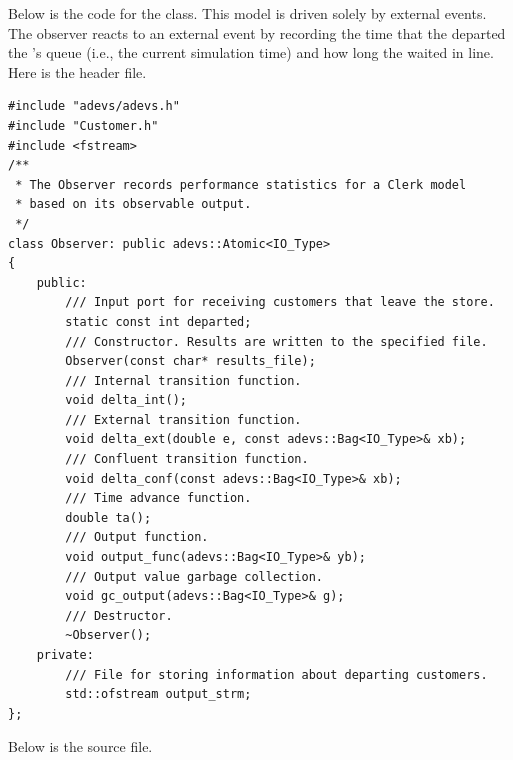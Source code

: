 Below is the code for the  class. This model is driven solely by external events. The observer reacts to an external event by recording the time that the  departed the 's queue (i.e., the current simulation time) and how long the  waited in line. Here is the  header file.
\begin{verbatim}
#include "adevs/adevs.h"
#include "Customer.h"
#include <fstream>
/**
 * The Observer records performance statistics for a Clerk model
 * based on its observable output.
 */
class Observer: public adevs::Atomic<IO_Type>
{
    public:
        /// Input port for receiving customers that leave the store.
        static const int departed;
        /// Constructor. Results are written to the specified file.
        Observer(const char* results_file);
        /// Internal transition function.
        void delta_int();
        /// External transition function.
        void delta_ext(double e, const adevs::Bag<IO_Type>& xb);
        /// Confluent transition function.
        void delta_conf(const adevs::Bag<IO_Type>& xb);
        /// Time advance function.
        double ta();
        /// Output function.
        void output_func(adevs::Bag<IO_Type>& yb);
        /// Output value garbage collection.
        void gc_output(adevs::Bag<IO_Type>& g);
        /// Destructor.
        ~Observer();
    private:
        /// File for storing information about departing customers.
        std::ofstream output_strm;
};
\end{verbatim}
Below is the  source file.
